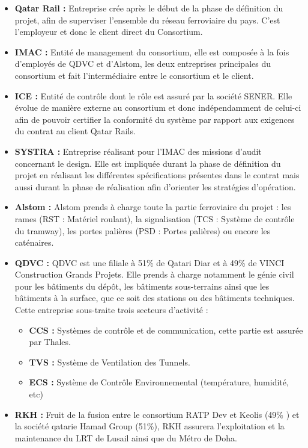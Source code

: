 \begin{itemize}
\item \textbf{Qatar Rail :} Entreprise crée après le début de la phase de définition du projet, afin de superviser l'ensemble du réseau ferroviaire du pays. C'est l'employeur et donc le client direct du Consortium. 
\item \textbf{IMAC :} Entité de management du consortium, elle est composée à la fois d'employés de QDVC et d'Alstom, les deux entreprises principales du consortium et fait l'intermédiaire entre le consortium et le client.
\item \textbf{ICE :} Entité de contrôle dont le rôle est assuré par la société SENER. Elle évolue de manière externe au consortium et donc indépendamment  de celui-ci afin de pouvoir certifier la conformité du système par rapport aux exigences du contrat au client Qatar Rails. 
\item \textbf{SYSTRA :} Entreprise réalisant pour l'IMAC des missions d'audit concernant le design. Elle est impliquée durant la phase de définition du projet en réalisant les différentes spécifications présentes dans le contrat mais aussi durant la phase de réalisation afin d'orienter les stratégies d'opération. 
\item \textbf{Alstom :} Alstom prends à charge toute la partie ferroviaire du projet : les rames (\gls{RST} : Matériel roulant), la signalisation (\gls{TCS} : Système de contrôle du tramway), les portes palières (\gls{PSD} : Portes palières) ou encore les caténaires. 
\item \textbf{QDVC :} QDVC est une  filiale à 51\% de Qatari Diar et à 49\% de VINCI Construction Grands Projets. Elle prends à charge notamment le génie civil pour les bâtiments du dépôt, les bâtiments sous-terrains ainsi que les bâtiments à la surface, que ce soit des stations ou des bâtiments techniques. Cette entreprise sous-traite trois secteurs d'activité :
\begin{itemize}
\item \textbf{\gls{CCS} :} Systèmes de contrôle et de communication, cette partie est assurée par Thales. 
\item \textbf{\gls{TVS} :} Système de Ventilation des Tunnels.
\item \textbf{\gls{ECS} :} Système de Contrôle Environnemental (température, humidité, etc)
\end{itemize}
\item \textbf{RKH :} Fruit de la fusion entre le consortium RATP Dev et Keolis (49\% ) et la société qatarie Hamad Group (51\%), RKH assurera l'exploitation et la maintenance du LRT de Lusail ainsi que du Métro de Doha.
\end{itemize}

